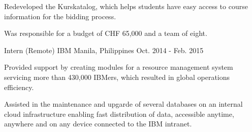 \begin{cventries}
{\begin{cvitems}
        \item {Redeveloped the Kurskatalog, which helps students have easy access to course information for the bidding process.}
        \item {Was responsible for a budget of CHF 65,000 and a team of eight.}
      \end{cvitems}
    }
  \cventry
    {Intern (Remote)} %
    {IBM} %
    {Manila, Philippines} %
    {Oct. 2014 - Feb. 2015} %
    {} %
    {
      \begin{cvitems} %
        \item {Provided support by creating modules for a resource management system servicing more than 430,000 IBMers, which resulted in global operations efficiency.}
        \item {Assisted in the maintenance and upgarde of several databases on an internal cloud infrastructure enabling fast distribution of data, accessible anytime, anywhere and on any device connected to the IBM intranet.}
      \end{cvitems}
    }

\end{cventries}
